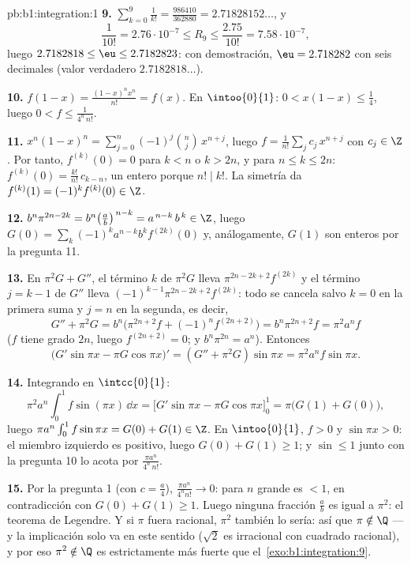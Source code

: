 \begin{solution}{pb:b1:integration:1}
\textbf{9.} $\sum_{k=0}^{9} \frac{1}{k!} = \frac{986410}{362880}
= 2.71828152\dots$, y
\[
\frac{1}{10!} = 2.76\cdot10^{-7} \leq R_9 \leq
\frac{2.75}{10!} = 7.58\cdot10^{-7} ,
\]
luego $2.7182818 \leq \eu \leq 2.7182823$: con demostración,
$\eu = 2.718282$ con seis decimales (valor verdadero $2.7182818\dots$).

\textbf{10.} $f(1 - x) = \frac{(1-x)^n x^n}{n!} = f(x)$. En
$\intoo{0}{1}$: $0 < x(1-x) \leq \frac14$, luego
$0 < f \leq \frac{1}{4^n\,n!}$.

\textbf{11.} $x^n(1-x)^n = \sum_{j=0}^{n} (-1)^j\binom
nj\,x^{n+j}$, luego $f = \frac{1}{n!}\sum_j c_j\,x^{n+j}$ con
$c_j \in \Z$. Por tanto, $f^{(k)}(0) = 0$ para $k < n$ o $k > 2n$, y
para $n \leq k \leq 2n$: $f^{(k)}(0) = \frac{k!}{n!}\, c_{k-n}$, un
entero porque $n! \mid k!$. La simetría da
$f^{(k)}(1) = (-1)^k f^{(k)}(0) \in \Z$.

\textbf{12.} $b^n \pi^{2n-2k} = b^n\bigl(\frac
ab\bigr)^{\,n-k} = a^{\,n-k}\,b^{\,k} \in \Z$, luego
$G(0) = \sum_k (-1)^k a^{n-k} b^k f^{(2k)}(0)$ y, análogamente,
$G(1)$ son enteros por la pregunta 11.

\textbf{13.} En $\pi^2 G + G''$, el término $k$ de $\pi^2 G$ lleva
$\pi^{2n-2k+2}f^{(2k)}$ y el término $j = k - 1$ de $G''$ lleva
$(-1)^{k-1}\pi^{2n-2k+2}f^{(2k)}$: todo se cancela salvo $k = 0$ en
la primera suma y $j = n$ en la segunda, es decir,
\[
G'' + \pi^2 G = b^n\bigl(\pi^{2n+2} f + (-1)^n f^{(2n+2)}\bigr)
= b^n \pi^{2n+2} f = \pi^2 a^n f
\]
($f$ tiene grado $2n$, luego $f^{(2n+2)} = 0$; y
$b^n\pi^{2n} = a^n$). Entonces
\[
\bigl(G'\sin\pi x - \pi G\cos\pi x\bigr)'
= (G'' + \pi^2 G)\sin \pi x = \pi^2 a^n f\sin\pi x .
\]

\textbf{14.} Integrando en $\intcc{0}{1}$:
\[
\pi^2 a^n \int_0^1 f\sin(\pi x)\,\dd x
= \bigl[G'\sin\pi x - \pi G\cos\pi x\bigr]_0^1
= \pi\bigl(G(1) + G(0)\bigr) ,
\]
luego $\pi a^n \int_0^1 f\sin\pi x = G(0) + G(1) \in \Z$. En
$\intoo{0}{1}$, $f > 0$ y $\sin\pi x > 0$: el miembro izquierdo es
positivo, luego $G(0) + G(1) \geq 1$; y $\sin \leq 1$ junto con la
pregunta 10 lo acota por $\frac{\pi a^n}{4^n\,n!}$.

\textbf{15.} Por la pregunta 1 (con $c = \frac a4$),
$\frac{\pi a^n}{4^n n!} \to 0$: para $n$ grande es $< 1$, en
contradicción con $G(0) + G(1) \geq 1$. Luego ninguna fracción
$\frac ab$ es igual a $\pi^2$: el teorema de Legendre. Y si $\pi$
fuera racional, $\pi^2$ también lo sería: así que $\pi \notin \Q$
--- y la implicación solo va en este sentido ($\sqrt2$ es irracional
con cuadrado racional), y por eso $\pi^2 \notin \Q$ es
estrictamente más fuerte que el~\cref{exo:b1:integration:9}.


\end{solution}
